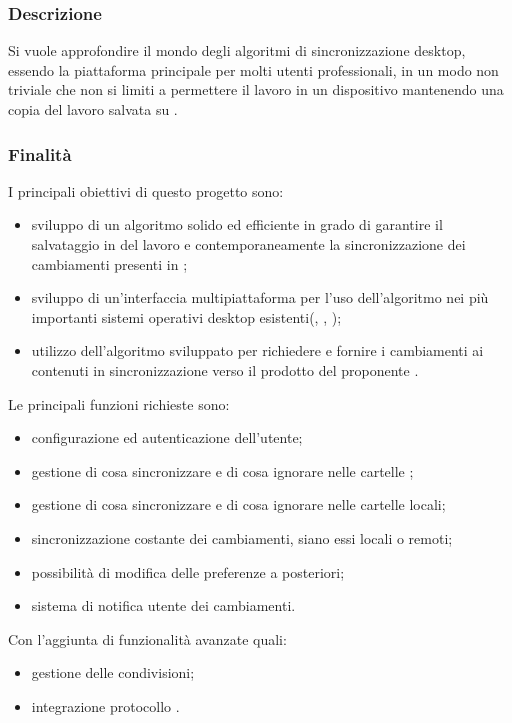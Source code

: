 \documentclass[]{article}
\begin{document}
            \subsubsection{Descrizione}
            Si vuole approfondire il mondo degli algoritmi di sincronizzazione desktop, essendo la piattaforma principale per molti utenti professionali, in un modo non triviale che non si limiti a permettere il lavoro in un dispositivo mantenendo una copia del lavoro salvata su .

            \subsubsection{Finalità}
            I principali obiettivi di questo progetto sono:
            \begin{itemize}
                \item sviluppo di un algoritmo solido ed efficiente in grado di garantire il salvataggio in  del lavoro e contemporaneamente la sincronizzazione dei cambiamenti presenti in ;
                \item sviluppo di un'interfaccia multipiattaforma per l'uso dell'algoritmo nei più importanti sistemi operativi desktop esistenti(, , );
                \item utilizzo dell'algoritmo sviluppato per richiedere e fornire i cambiamenti ai contenuti in sincronizzazione verso il prodotto del proponente .
            \end{itemize}
            Le principali funzioni richieste sono:
            \begin{itemize}
                \item configurazione ed autenticazione dell'utente;
                \item gestione di cosa sincronizzare e di cosa ignorare nelle cartelle ;
                \item gestione di cosa sincronizzare e di cosa ignorare nelle cartelle locali;
                \item sincronizzazione costante dei cambiamenti, siano essi locali o remoti;
                \item possibilità di modifica delle preferenze a posteriori;
                \item sistema di notifica utente dei cambiamenti.
            \end{itemize}
            Con l'aggiunta di funzionalità avanzate quali:
            \begin{itemize}
                \item gestione delle condivisioni;
                \item integrazione protocollo .
            \end{itemize}
\end{document}
